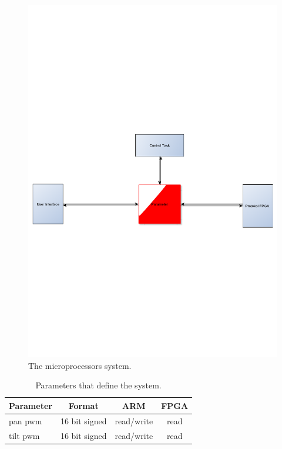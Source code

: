 \begin{figure}[htb]
	\centering
	\includegraphics[scale=0.5,clip,trim=0 300 0 300]{graphics/microprocessor} %
	\caption{The microprocessors system.}
	\label{fig:microprocessor}			%
\end{figure}


\begin{table}[htb]				
	\centering
	\begin{tabular}{lccc}			
	Parameter & Format & ARM & FPGA \\		
	\midrule												
pan pwm &16 bit signed & read/write & read \\
tilt pwm & 16 bit signed  & read/write & read
	\end{tabular}
	\caption{Parameters that define the system.}				
	\label{tab:parameters}			
\end{table}


